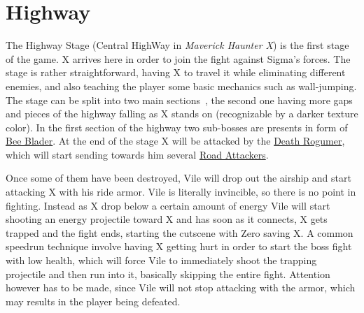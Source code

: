 \chapter{Highway}
The Highway Stage (Central HighWay in \textit{Maverick Haunter X}) is the first stage of the game. X arrives here in order to join the fight against Sigma's forces.
The stage is rather straightforward, having X to travel it while eliminating different enemies, and also teaching the player some basic mechanics such as wall-jumping.  The stage can be split into two main sections~\cite{stratwiki:HighWay}, the second one having more gaps and pieces of the highway falling as X stands on (recognizable by a darker texture color). In the first section of the highway two sub-bosses are presents in form of \hyperlink{miniboss:Bee_Blader}{Bee Blader}. At the end of the stage X will be attacked by the \hyperlink{veichle:Death_Rogumer}{Death Rogumer}, which will start sending towards him several \hyperlink{enem:Road_Attackers}{Road Attackers}.


Once some of them have been destroyed, Vile will drop out the airship and start attacking X with his ride armor. Vile is literally invincible, so there is 
no point in fighting. Instead as X drop below a certain amount of energy Vile will start shooting an energy projectile toward X and has soon as it connects, X gets trapped and the fight ends, starting the cutscene with Zero saving X. A common speedrun  technique involve having X getting hurt in order to start the boss fight with low health, which will force Vile to immediately shoot the trapping projectile and then run into it, basically skipping the entire fight.  Attention however has to be made, since Vile will not stop attacking with the armor, which may results in the player being defeated.

